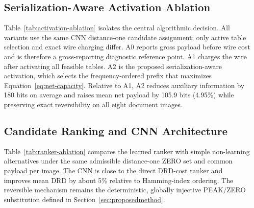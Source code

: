 \documentclass[a4paper,fleqn]{cas-dc}
\begin{document}
\subsection{Serialization-Aware Activation Ablation}
\label{subsec:component-ablations}

Table~\ref{tab:activation-ablation} isolates the central algorithmic decision.
All variants use the same CNN distance-one candidate assignment; only active
table selection and exact wire charging differ. A0 reports gross payload before
wire cost and is therefore a gross-reporting diagnostic reference point. A1
charges the wire after activating all feasible tables. A2 is the proposed
serialization-aware activation, which selects the frequency-ordered prefix that
maximizes Equation~\ref{eq:net-capacity}. Relative to A1, A2 reduces auxiliary
information by 180 bits on average and raises mean net payload by 105.9 bits
(4.95\%) while preserving exact reversibility on all eight document images.

\begin{table}[t]
\centering
\caption{Central ablation of serialization-aware mapping activation on the
eight document images. Values are means in bits except DRD; the post-hoc value
in A0 is the net payload obtained when the exact wire is charged after the
gross-only selection.}
\label{tab:activation-ablation}
\end{table}

\subsection{Candidate Ranking and CNN Architecture}

Table~\ref{tab:ranker-ablation} compares the learned ranker with simple
non-learning alternatives under the same admissible distance-one ZERO set and
common payload per image. The CNN is close to the direct DRD-cost ranker and
improves mean DRD by about 5\% relative to Hamming-index ordering. The
reversible mechanism remains the deterministic, globally injective PEAK/ZERO
substitution defined in
Section~\ref{sec:proposedmethod}.
\end{document}
